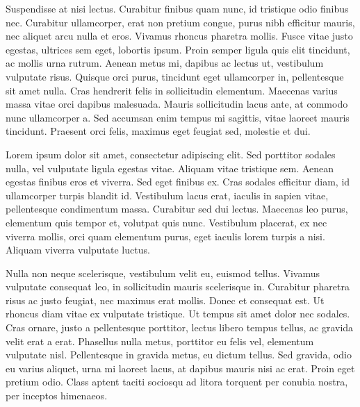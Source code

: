 \documentclass[11pt]{article}
\begin{document}
Suspendisse at nisi lectus. Curabitur finibus quam nunc, id tristique odio finibus nec. Curabitur ullamcorper, erat non pretium congue, purus nibh efficitur mauris, nec aliquet arcu nulla et eros. Vivamus rhoncus pharetra mollis. Fusce vitae justo egestas, ultrices sem eget, lobortis ipsum. Proin semper ligula quis elit tincidunt, ac mollis urna rutrum. Aenean metus mi, dapibus ac lectus ut, vestibulum vulputate risus. Quisque orci purus, tincidunt eget ullamcorper in, pellentesque sit amet nulla. Cras hendrerit felis in sollicitudin elementum. Maecenas varius massa vitae orci dapibus malesuada. Mauris sollicitudin lacus ante, at commodo nunc ullamcorper a. Sed accumsan enim tempus mi sagittis, vitae laoreet mauris tincidunt. Praesent orci felis, maximus eget feugiat sed, molestie et dui.

\onecolumn
Lorem ipsum dolor sit amet, consectetur adipiscing elit. Sed porttitor sodales nulla, vel vulputate ligula egestas vitae. Aliquam vitae tristique sem. Aenean egestas finibus eros et viverra. Sed eget finibus ex. Cras sodales efficitur diam, id ullamcorper turpis blandit id. Vestibulum lacus erat, iaculis in sapien vitae, pellentesque condimentum massa. Curabitur sed dui lectus. Maecenas leo purus, elementum quis tempor et, volutpat quis nunc. Vestibulum placerat, ex nec viverra mollis, orci quam elementum purus, eget iaculis lorem turpis a nisi. Aliquam viverra vulputate luctus.

Nulla non neque scelerisque, vestibulum velit eu, euismod tellus. Vivamus vulputate consequat leo, in sollicitudin mauris scelerisque in. Curabitur pharetra risus ac justo feugiat, nec maximus erat mollis. Donec et consequat est. Ut rhoncus diam vitae ex vulputate tristique. Ut tempus sit amet dolor nec sodales. Cras ornare, justo a pellentesque porttitor, lectus libero tempus tellus, ac gravida velit erat a erat. Phasellus nulla metus, porttitor eu felis vel, elementum vulputate nisl. Pellentesque in gravida metus, eu dictum tellus. Sed gravida, odio eu varius aliquet, urna mi laoreet lacus, at dapibus mauris nisi ac erat. Proin eget pretium odio. Class aptent taciti sociosqu ad litora torquent per conubia nostra, per inceptos himenaeos.
\end{document}

